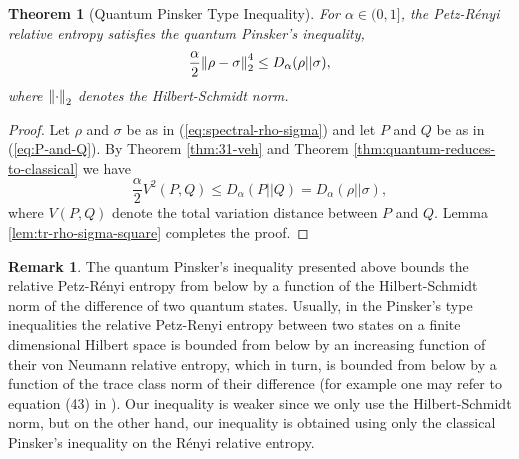 \documentclass[12pt,a4paper,oneside]{article}
\numberwithin{equation}{section}
\theoremstyle{definition}  %
\newtheorem{rmk}[defn]{Remark}
\theoremstyle{plain}  %
\newtheorem{thm}[defn]{Theorem}
\theoremstyle{remark} %
\begin{document}
\begin{thm}[Quantum Pinsker Type Inequality]\label{thm:quantum-pinsker}
 For $\alpha\in (0,1]$, the Petz-R\'enyi relative entropy satisfies the quantum Pinsker's inequality, \begin{align}
  \frac{\alpha}{2}\norm{\rho-\sigma}_2^4\leq   D_{\alpha}(\rho||\sigma),
 \end{align}
 where $\norm{\cdot}_2$ denotes the Hilbert-Schmidt norm.
\end{thm}
\begin{proof} Let $\rho$ and $\sigma$ be as in (\ref{eq:spectral-rho-sigma})  and let $P$ and $Q$ be as in (\ref{eq:P-and-Q}).
By Theorem \ref{thm:31-veh} and Theorem \ref{thm:quantum-reduces-to-classical} we have\[\frac{\alpha}{2}V^2(P,Q)\leq D_{\alpha}(P||Q) =D_{\alpha}(\rho||\sigma) ,\]
where $V(P,Q)$ denote the total variation distance between $P$ and $Q$.  Lemma \ref{lem:tr-rho-sigma-square} completes the proof.
\end{proof}
\begin{rmk}
The quantum Pinsker's inequality presented above  bounds the relative Petz-R\'{e}nyi entropy from
below by a function of the Hilbert-Schmidt norm of the difference of two quantum states. Usually, in the Pinsker's type inequalities the relative Petz-Renyi entropy between two states on a finite dimensional Hilbert space
is bounded from below by an increasing  function of their von Neumann relative entropy, which in turn, is bounded from below by a 
function of the trace class norm of their difference (for example one may refer to equation (43) in \cite{rastegin-2013}). Our inequality is weaker since we only use the Hilbert-Schmidt norm, but on the 
other hand, our inequality is obtained using only the classical Pinsker's inequality on the R\'{e}nyi relative entropy.
\end{rmk}
\end{document}
